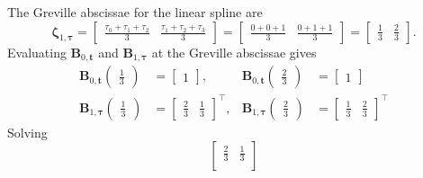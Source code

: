 \begin{example}
    The Greville abscissae for the linear spline are 
    \begin{equation*}
        \boldsymbol \zeta_{1,\boldsymbol \tau} = 
        \begin{bmatrix}
            \frac{\tau_0 + \tau_1 + \tau_2}{3} &
            \frac{\tau_1 + \tau_2 + \tau_3}{3} 
        \end{bmatrix}
        =
        \begin{bmatrix}
            \frac{0 + 0 + 1}{3} & \frac{0 + 1 + 1}{3}
        \end{bmatrix} = \begin{bmatrix}
            \frac{1}{3} & \frac{2}{3}
        \end{bmatrix}.
    \end{equation*}
    Evaluating $\mathbf B_{0, \mathbf t}$ and $\mathbf B_{1, \boldsymbol \tau}$  at the Greville abscissae gives
    \begin{equation*}
        \begin{aligned}
            \mathbf B_{0, \mathbf t}\begin{pmatrix}\frac{1}{3}\end{pmatrix} &= \begin{bmatrix} 1 \end{bmatrix}, 
            &\mathbf B_{0, \mathbf t}\begin{pmatrix}\frac{2}{3}\end{pmatrix} &= \begin{bmatrix} 1 \end{bmatrix} 
            \\
            \mathbf B_{1, \boldsymbol \tau}\begin{pmatrix}\frac{1}{3}\end{pmatrix} &= \begin{bmatrix} \frac{2}{3} & \frac{1}{3} \end{bmatrix}^\top, 
            &\mathbf B_{1, \boldsymbol \tau}\begin{pmatrix}\frac{2}{3}\end{pmatrix} &= \begin{bmatrix} \frac{1}{3} & \frac{2}{3} \end{bmatrix}^\top
        \end{aligned}
    \end{equation*}
    Solving
    \begin{equation*}
        \begin{bmatrix}
            \frac{2}{3} & \frac{1}{3} \\

\end{bmatrix}
\end{equation*}
\end{example}
